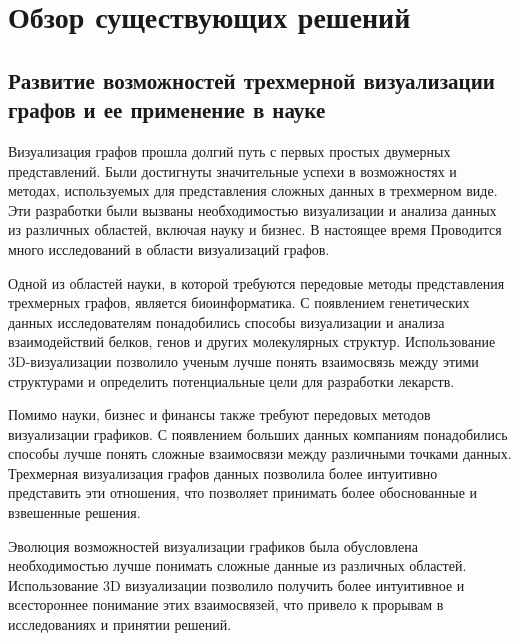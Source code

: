 \section{Обзор существующих решений}
\label{sec:Chapter2} 

\subsection{Развитие возможностей трехмерной визуализации графов и ее применение в науке}

Визуализация графов прошла долгий путь с первых простых двумерных представлений. Были достигнуты значительные успехи в возможностях и методах, используемых для представления сложных данных в трехмерном виде. Эти разработки были вызваны необходимостью визуализации и анализа данных из различных областей, включая науку и бизнес. В настоящее время Проводится много исследований в области визуализаций графов. \cite{GraphDrawingAlgorithms} \cite{AutomaticGraphDrawingAlgorithms} \cite{TechniqueForDrawingDirectedGraphs} \cite{MethodsAndToolsForVisualizationOfGraphsAndGraphAlgorithms}

Одной из областей науки, в которой требуются передовые методы представления трехмерных графов, является биоинформатика. С появлением генетических данных исследователям понадобились способы визуализации и анализа взаимодействий белков, генов и других молекулярных структур. Использование 3D-визуализации позволило ученым лучше понять взаимосвязь между этими структурами и определить потенциальные цели для разработки лекарств.

Помимо науки, бизнес и финансы также требуют передовых методов визуализации графиков. С появлением больших данных компаниям понадобились способы лучше понять сложные взаимосвязи между различными точками данных. Трехмерная визуализация графов данных позволила более интуитивно представить эти отношения, что позволяет принимать более обоснованные и взвешенные решения.

Эволюция возможностей визуализации графиков была обусловлена необходимостью лучше понимать сложные данные из различных областей. Использование 3D визуализации позволило получить более интуитивное и всестороннее понимание этих взаимосвязей, что привело к прорывам в исследованиях и принятии решений. \cite{VisualAnalysisOfGraphAlgorithmDynamics}

